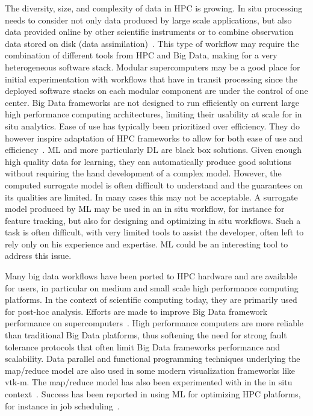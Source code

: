 The diversity, size, and complexity of data in HPC is growing. 
In situ processing needs to consider not only data produced by large scale applications, but also data provided online by other scientific instruments or to combine observation data stored on disk (data assimilation)~\cite{A18}. 
This type of workflow may require the combination of different tools from HPC and Big Data, making for a very heterogeneous software stack. 
Modular supercomputers may be a good place for initial experimentation with workflows that have in transit processing since the deployed software stacks on each modular component are under the control of one center.
Big Data frameworks are not designed to run efficiently on current large high performance computing architectures, limiting their usability at scale for in situ analytics. 
Ease of use has typically been prioritized over efficiency. They do however inspire adaptation of HPC frameworks to allow for both ease of use and efficiency~\cite{PD11}.
ML and more particularly DL are black box solutions. 
Given enough high quality data for learning, they can automatically produce good solutions without requiring the hand development of a complex model.
However, the  computed surrogate model is often difficult to understand and the guarantees on its qualities are limited. 
In many cases this may not be acceptable. 
A surrogate model produced by ML may be used in an in situ workflow, for instance for feature tracking, but also for designing and optimizing in situ workflows. 
Such a task is often  difficult, with very limited tools to assist the developer, often left to rely only on his experience and expertise. 
ML could be an interesting tool to address this issue.

Many big data workflows have been ported to HPC hardware and are available for users, in particular on medium and small scale high performance computing platforms. 
In the context of scientific computing today, they are primarily used for post-hoc analysis. 
Efforts are made to improve Big Data framework performance on supercomputers~\cite{PD11}. 
High performance computers are more reliable than traditional Big Data platforms, thus softening the need for strong fault tolerance protocols that often limit Big Data frameworks performance and scalability. 
Data parallel and functional programming techniques underlying the map/reduce model are also used in some modern visualization frameworks like vtk-m. 
The map/reduce model has also been experimented with in the in situ context~\cite{WB15}.
Success has been reported in using ML for optimizing HPC platforms, for instance in job scheduling~\cite{CC17}.


